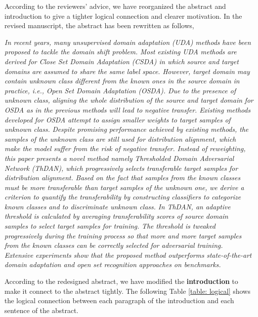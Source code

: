 According to the reviewers' advice, we have reorganized the abstract and introduction to give a tighter logical connection and clearer motivation.
In the revised manuscript, the abstract has been rewritten as follows,
\begin{siderules}
    \textit{
        \footnotesize
        In recent years, many unsupervised domain adaptation (UDA) methods have been proposed to tackle the domain shift problem.
        Most existing UDA methods are derived for Close Set Domain Adaptation (\textit{CSDA}) in which source and target domains are assumed to share the same label space.
        However, target domain may contain unknown class different from the known ones in the source domain in practice, i.e., Open Set Domain Adaptation (\textit{OSDA}).
        Due to the presence of unknown class, aligning the whole distribution of the source and target domain for OSDA as in the previous methods will lead to negative transfer.
        Existing methods developed for OSDA attempt to assign smaller weights to target samples of unknown class.
        Despite promising performance achieved by existing methods, the samples of the unknown class are still used for distribution alignment, which make the model suffer from the risk of negative transfer.
        Instead of reweighting, this paper presents a novel method namely Thresholded Domain Adversarial Network (\textit{ThDAN}), which progressively selects transferable target samples for distribution alignment.
        Based on the fact that samples from the known classes must be more transferable than target samples of the unknown one, we derive a criterion to quantify the transferability by constructing classifiers to categorize known classes and to discriminate unknown class.
        In ThDAN, an adaptive threshold is calculated by averaging transferability scores of source domain samples to select target samples for training.
        The threshold is tweaked progressively during the training process so that more and more target samples from the known classes can be correctly selected for adversarial training.
        Extensive experiments show that the proposed method outperforms state-of-the-art domain adaptation and open set recognition approaches on benchmarks.
    }
\end{siderules}

According to the redesigned abstract, we have modified the \textbf{introduction} to make it connect to the abstract tightly.
The following Table \ref{table: logical} shows the logical connection between each paragraph of the introduction and each sentence of the abstract.

